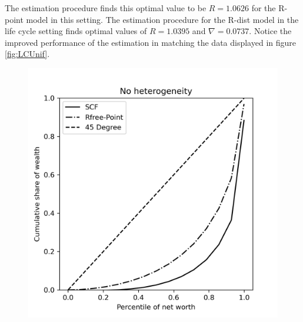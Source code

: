\unskip

\par The estimation procedure finds this optimal value to be $R = 1.0626$ for the R-point model in this setting. The estimation procedure for the R-dist model in the life cycle setting finds optimal values of $R = 1.0395$ and $\nabla = 0.0737$. Notice the improved performance of the estimation in matching the data displayed in figure \ref{fig:LCUnif}.

\begin{figure}[h]
    \centering
    \begin{minipage}{0.48\textwidth}
        \centering
        \includegraphics[width=\textwidth]{../Figures/LCrrPointNetWorthPlot.png}
    \end{minipage}
    \hfill
    \begin{minipage}{0.48\textwidth}
        \centering

\end{minipage}
\end{figure}
